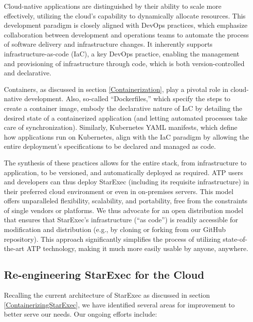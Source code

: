 \documentclass{easychair}
\begin{document}
Cloud-native applications are distinguished by their ability to scale more effectively, utilizing the cloud's capability to dynamically allocate resources. This development paradigm is closely aligned with DevOps practices, which emphasize collaboration between development and operations teams to automate the process of software delivery and infrastructure changes. It inherently supports infrastructure-as-code (IaC), a key DevOps practice, enabling the management and provisioning of infrastructure through code, which is both version-controlled and declarative.

Containers, as discussed in section \ref{Containerization}, play a pivotal role in cloud-native development. Also, so-called ``Dockerfiles,'' which specify the steps to create a container image, embody the declarative nature of IaC by detailing the desired state of a containerized application (and letting automated processes take care of synchronization). Similarly, Kubernetes YAML manifests, which define how applications run on Kubernetes, align with the IaC paradigm by allowing the entire deployment's specifications to be declared and managed as code.

The synthesis of these practices allows for the entire stack, from infrastructure to application, to be versioned, and automatically deployed as required. ATP users and developers can thus deploy StarExec (including its requisite infrastructure) in their preferred cloud environment or even in on-premises servers. This model offers unparalleled flexibility, scalability, and portability, free from the constraints of single vendors or platforms.
We thus advocate for an open distribution model that ensures that StarExec's infrastructure (``as code'') is readily accessible for modification and distribution (e.g., by cloning or forking from our GitHub repository). This approach significantly simplifies the process of utilizing state-of-the-art ATP technology, making it much more easily usable by anyone, anywhere.

\subsection{Re-engineering StarExec for the Cloud}

Recalling the current architecture of StarExec as discussed in section \ref{ContainerizingStarExec}, we have identified several areas for improvement to better serve our needs. Our ongoing efforts include:
\end{document}

